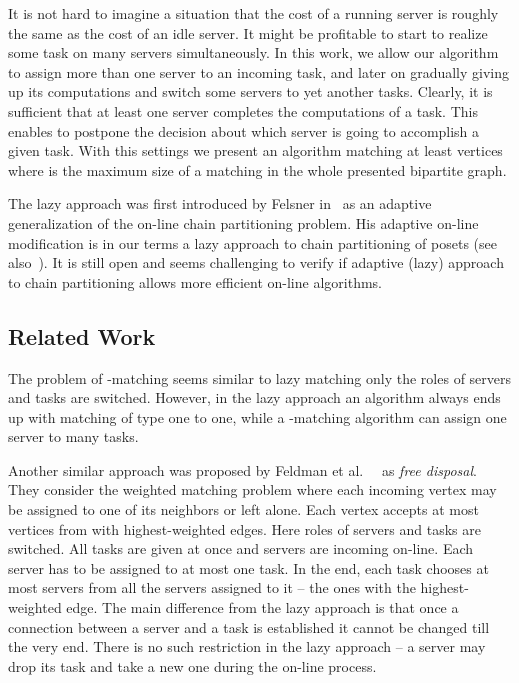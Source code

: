 \documentclass[12pt]{amsart}
\theoremstyle{definition}
\begin{document}
It is not hard to imagine a situation that the cost of a running server is roughly the same as the cost of an idle server. 
It might be profitable to start to realize some task on many servers simultaneously.
In this work, we allow our algorithm to assign more than one server to an incoming task, and later on gradually giving up its computations and switch some servers to yet another tasks.
Clearly, it is sufficient that at least one server completes the computations of a task.
This enables to postpone the decision about which server is going to accomplish a given task. 
With this settings we present an algorithm matching at least  vertices where  is the maximum size of a matching in the whole presented bipartite graph.


The lazy approach was first introduced by Felsner in~\cite{Fel97} 
as an adaptive generalization of the on-line chain partitioning problem. 
His adaptive on-line modification is in our terms a lazy approach to chain partitioning of posets (see also~\cite{Kloch07}).
It is still open and seems challenging to verify if adaptive (lazy) approach to chain partitioning allows more efficient on-line algorithms.

\subsection{Related Work}
The problem of -matching seems similar to lazy matching only the roles of servers and tasks are switched. 
However, in the lazy approach an algorithm always ends up with matching of type one to one, while a -matching algorithm can assign one server to many tasks.

Another similar approach was proposed by Feldman et al.\ ~\cite{FMMMa2009} as \emph{free disposal}.
They consider the weighted matching problem where each incoming vertex  may be assigned to one of its neighbors or left alone.
Each vertex  accepts at most  vertices from  with highest-weighted edges.
Here roles of servers and tasks are switched. 
All tasks are given at once and servers are incoming on-line. 
Each server has to be assigned to at most one task. 
In the end, each task chooses at most  servers from all the servers assigned to it  -- the ones with the highest-weighted edge.
The main difference from the lazy approach is that once a connection between a server and a task is established it cannot be changed till the very end.
There is no such restriction in the lazy approach -- a server may drop its task and take a new one during the on-line process.
\end{document}

